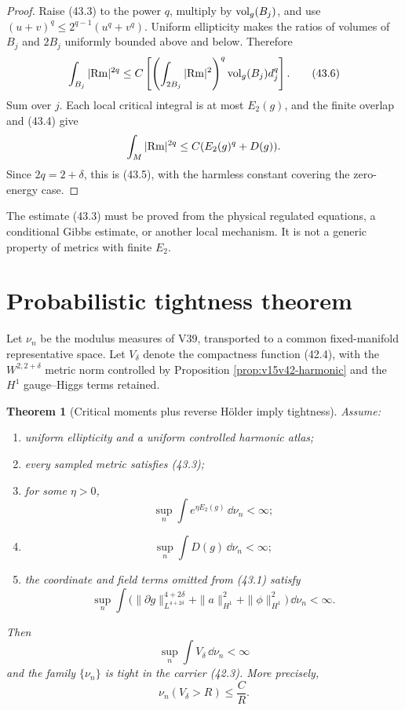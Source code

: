 \documentclass[11pt]{article}
\newtheorem{theorem}{Theorem}[section]
\theoremstyle{remark}
\begin{document}
\begin{proof}
Raise (43.3) to the power \(q\), multiply by
\({\rm vol}_g(B_j)\), and use
\((u+v)^q\leq2^{q-1}(u^q+v^q)\).  Uniform ellipticity makes the
ratios of volumes of \(B_j\) and \(2B_j\) uniformly bounded above
and below.  Therefore
\[
 \int_{B_j}|{\rm Rm}|^{2q}
 \leq C\left[
 \left(\int_{2B_j}|{\rm Rm}|^2\right)^q
 {\rm vol}_g(B_j)d_j^q\right].                          \tag{43.6}
\]
Sum over \(j\).  Each local critical integral is at most
\(E_2(g)\), and the finite overlap and (43.4) give
\[
 \int_M|{\rm Rm}|^{2q}
 \leq C(E_2(g)^q+D(g)).
\]
Since \(2q=2+\delta\), this is (43.5), with the harmless constant
covering the zero-energy case.
\end{proof}

The estimate (43.3) must be proved from the physical regulated
equations, a conditional Gibbs estimate, or another local mechanism.
It is not a generic property of metrics with finite \(E_2\).

\section{Probabilistic tightness theorem}

Let \(\nu_n\) be the modulus measures of V39, transported to a
common fixed-manifold representative space.  Let \(V_\delta\) denote
the compactness function (42.4), with the \(W^{2,2+\delta}\) metric
norm controlled by Proposition \ref{prop:v15v42-harmonic} and the
\(H^1\) gauge--Higgs terms retained.

\begin{theorem}[Critical moments plus reverse Hölder imply tightness]
\label{thm:v15v43-prob-tight}
Assume:
\begin{enumerate}
\item uniform ellipticity and a uniform controlled harmonic atlas;
\item every sampled metric satisfies (43.3);
\item for some \(\eta>0\),
      \[
       \sup_n\int e^{\eta E_2(g)}\,\dd\nu_n<\infty;       \tag{43.7}
      \]
\item
      \[
       \sup_n\int D(g)\,\dd\nu_n<\infty;                 \tag{43.8}
      \]
\item the coordinate and field terms omitted from (43.1) satisfy
      \[
       \sup_n\int
       \bigl(\|\partial g\|_{L^{4+2\delta}}^{4+2\delta}
       +\|a\|_{H^1}^2+\|\phi\|_{H^1}^2\bigr)\,\dd\nu_n
       <\infty.                                          \tag{43.9}
      \]
\end{enumerate}
Then
\[
 \sup_n\int V_\delta\,\dd\nu_n<\infty                  \tag{43.10}
\]
and the family \(\{\nu_n\}\) is tight in the carrier (42.3).
More precisely,
\[
 \nu_n(V_\delta>R)\leq \frac{C}{R}.                     \tag{43.11}
\]
\end{theorem}
\end{document}
